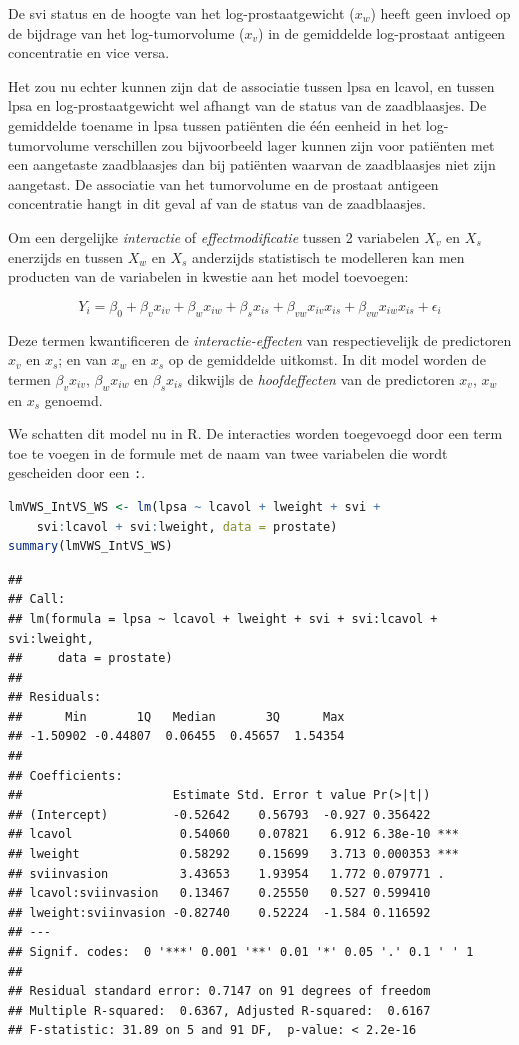 \documentclass[
  12pt,dutch,coursenotes]{book}
\newcommand{\passthrough}[1]{#1}
\theoremstyle{definition}
\theoremstyle{definition}
\theoremstyle{definition}
\theoremstyle{definition}
\theoremstyle{remark}
\begin{document}
De svi status en de hoogte van het log-prostaatgewicht (\(x_w\)) heeft geen invloed op de bijdrage van het log-tumorvolume (\(x_v\)) in de gemiddelde log-prostaat antigeen concentratie en vice versa.

Het zou nu echter kunnen zijn dat de associatie tussen lpsa en lcavol, en tussen lpsa en log-prostaatgewicht wel afhangt van de status van de zaadblaasjes. De gemiddelde toename in lpsa tussen patiënten die één eenheid in het log-tumorvolume verschillen zou bijvoorbeeld lager kunnen zijn voor patiënten met een aangetaste zaadblaasjes dan bij patiënten waarvan de zaadblaasjes niet zijn aangetast. De associatie van het tumorvolume en de prostaat antigeen concentratie hangt in dit geval af van de status van de zaadblaasjes.

Om een dergelijke \textit{interactie} of \textit{effectmodificatie} tussen 2 variabelen \(X_v\) en \(X_s\) enerzijds en tussen \(X_w\) en \(X_s\) anderzijds statistisch te modelleren kan men producten van de variabelen in kwestie aan het model toevoegen:

\[
Y_i = \beta_0 + \beta_v x_{iv} + \beta_w x_{iw} +\beta_s x_{is} + \beta_{vw} x_{iv}x_{is} + \beta_{vw} x_{iw}x_{is} +\epsilon_i
\]

Deze termen kwantificeren de \emph{interactie-effecten} van respectievelijk de predictoren \(x_v\) en \(x_s\); en van \(x_w\) en \(x_s\) op de gemiddelde uitkomst.
In dit model worden de termen \(\beta_vx_{iv}\), \(\beta_wx_{iw}\) en \(\beta_sx_{is}\) dikwijls de \emph{hoofdeffecten} van de predictoren \(x_v\), \(x_w\) en \(x_s\) genoemd.

We schatten dit model nu in R. De interacties worden toegevoegd door een term toe te voegen in de formule met de naam van twee variabelen die wordt gescheiden door een \passthrough{\lstinline!:!}.

\begin{lstlisting}[language=R]
lmVWS_IntVS_WS <- lm(lpsa ~ lcavol + lweight + svi +
    svi:lcavol + svi:lweight, data = prostate)
summary(lmVWS_IntVS_WS)
\end{lstlisting}

\begin{lstlisting}
## 
## Call:
## lm(formula = lpsa ~ lcavol + lweight + svi + svi:lcavol + svi:lweight, 
##     data = prostate)
## 
## Residuals:
##      Min       1Q   Median       3Q      Max 
## -1.50902 -0.44807  0.06455  0.45657  1.54354 
## 
## Coefficients:
##                     Estimate Std. Error t value Pr(>|t|)    
## (Intercept)         -0.52642    0.56793  -0.927 0.356422    
## lcavol               0.54060    0.07821   6.912 6.38e-10 ***
## lweight              0.58292    0.15699   3.713 0.000353 ***
## sviinvasion          3.43653    1.93954   1.772 0.079771 .  
## lcavol:sviinvasion   0.13467    0.25550   0.527 0.599410    
## lweight:sviinvasion -0.82740    0.52224  -1.584 0.116592    
## ---
## Signif. codes:  0 '***' 0.001 '**' 0.01 '*' 0.05 '.' 0.1 ' ' 1
## 
## Residual standard error: 0.7147 on 91 degrees of freedom
## Multiple R-squared:  0.6367, Adjusted R-squared:  0.6167 
## F-statistic: 31.89 on 5 and 91 DF,  p-value: < 2.2e-16
\end{lstlisting}
\end{document}
